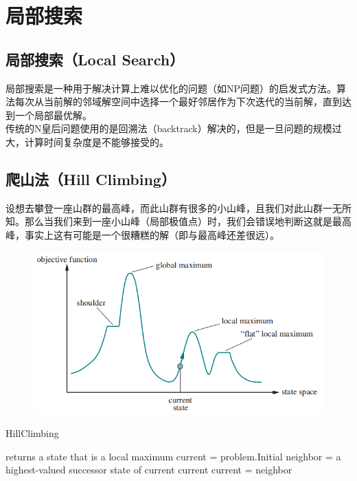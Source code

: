 \newpage

\section{局部搜索}

\subsection{局部搜索（Local Search）}

局部搜索是一种用于解决计算上难以优化的问题（如NP问题）的启发式方法。算法每次从当前解的邻域解空间中选择一个最好邻居作为下次迭代的当前解，直到达到一个局部最优解。\\

传统的N皇后问题使用的是回溯法（backtrack）解决的，但是一旦问题的规模过大，计算时间复杂度是不能够接受的。\\

\subsection{爬山法（Hill Climbing）}

设想去攀登一座山群的最高峰，而此山群有很多的小山峰，且我们对此山群一无所知。那么当我们来到一座小山峰（局部极值点）时，我们会错误地判断这就是最高峰，事实上这有可能是一个很糟糕的解（即与最高峰还差很远）。\\

\begin{figure}[H]
    \centering
    \includegraphics{img/Chapter1/1-6/1.png}
\end{figure}

\begin{algorithm}[H]
    \caption{HillClimbing}
    \begin{algorithmic}[1]
         returns a state that is a local maximum
        \State current = problem.Initial
        \State neighbor = a highest-valued successor state of current
        \State \Return current
        \EndIf
        \State current = neighbor
        \EndWhile
        \EndProcedure
    \end{algorithmic}
\end{algorithm}

